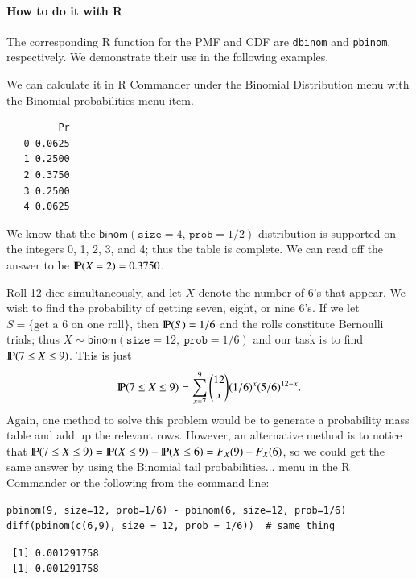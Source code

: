 \documentclass[captions=tableheading]{scrbook}
\begin{document}
\paragraph*{How to do it with \textsf{R}}

The corresponding \textsf{R} function for the PMF and CDF are \texttt{dbinom} and \texttt{pbinom}, respectively. We demonstrate their use in the following examples.  

\begin{example}
We can calculate it in \textsf{R} Commander under the \textsf{Binomial Distribution} menu with the \textsf{Binomial probabilities} menu item.


\begin{verbatim}
         Pr
   0 0.0625
   1 0.2500
   2 0.3750
   3 0.2500
   4 0.0625
\end{verbatim}

\end{example}

We know that the \(\mathsf{binom}(\mathtt{size}=4,\,\mathtt{prob}=1/2)\) distribution is supported on the integers 0, 1, 2, 3, and 4; thus the table is complete. We can read off the answer to be \(\P(X=2)=0.3750\).

\begin{example}
Roll 12 dice simultaneously, and let \(X\) denote the number of 6's that appear. We wish to find the probability of getting seven, eight, or nine 6's. If we let \(S=\{ \mbox{get a 6 on one roll} \} \), then \(\P(S)=1/6\) and the rolls constitute Bernoulli trials; thus \(X\sim\mathsf{binom}(\mathtt{size}=12,\ \mathtt{prob}=1/6)\) and our task is to find \(\P(7\leq X\leq9)\). This is just
\[ 
\P(7\leq X\leq9)=\sum_{x=7}^{9}{12 \choose x}(1/6)^{x}(5/6)^{12-x}.
\]
Again, one method to solve this problem would be to generate a probability mass table and add up the relevant rows. However, an alternative method is to notice that \(\P(7\leq X\leq9)=\P(X\leq9)-\P(X\leq6)=F_{X}(9)-F_{X}(6)\), so we could get the same answer by using the \textsf{Binomial tail probabilities}... menu in the \textsf{R} Commander or the following from the command line: 


\begin{verbatim}
pbinom(9, size=12, prob=1/6) - pbinom(6, size=12, prob=1/6)
diff(pbinom(c(6,9), size = 12, prob = 1/6))  # same thing
\end{verbatim}

\begin{verbatim}
 [1] 0.001291758
 [1] 0.001291758
\end{verbatim}

\end{example}
\end{document}
